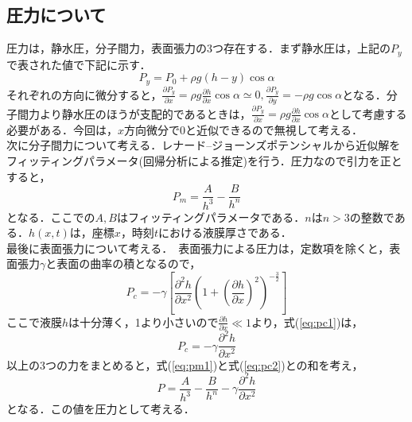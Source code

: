 \documentclass[autodetect-engine,dvipdfmx-if-dvi,ja=standard,a4paper,11pt]{bxjsarticle} %
\begin{document}
\subsection{圧力について}
圧力は，静水圧，分子間力，表面張力の3つ存在する．まず静水圧は，上記の$P_y$で表された値で下記に示す．　
\begin{equation}
P_y=P_0+\rho g(h-y)\cos\alpha
\end{equation}
それぞれの方向に微分すると，$\frac{\partial P_y}{\partial x}=\rho g\frac{\partial h}{\partial x}\cos\alpha\simeq0,\frac{\partial P_y}{\partial y}=-\rho g\cos\alpha$となる．分子間力より静水圧のほうが支配的であるときは，$\frac{\partial P_y}{\partial x}=\rho g\frac{\partial h}{\partial x}\cos\alpha$として考慮する必要がある．今回は，$x$方向微分で0と近似できるので無視して考える．\\
\　次に分子間力について考える．レナード--ジョーンズポテンシャルから近似解をフィッティングパラメータ(回帰分析による推定)を行う．圧力なので引力を正とすると，
\begin{equation}
P_m=\frac{A}{h^3}-\frac{B}{h^n}
\label{eq:pm1}
\end{equation}
となる．ここでの$A,B$はフィッティングパラメータである．$n$は$n>3$の整数である．$h(x,t)$は，座標$x$，時刻$t$における液膜厚さである．\\
\　最後に表面張力について考える．　表面張力による圧力は，定数項を除くと，表面張力$\gamma$と表面の曲率の積となるので，
\begin{equation}
P_c=-\gamma \left[\frac{\partial^2 h}{\partial x^2}\left(1+\left(\frac{\partial h}{\partial x}\right)^2\right)^{-\frac{3}{2}}\right]
\label{eq:pc1}
\end{equation}
ここで液膜$h$は十分薄く，1より小さいので$\frac{\partial h}{\partial x}\ll 1$より，式(\ref{eq:pc1})は，
\begin{equation}
P_c=-\gamma\frac{\partial^2 h}{\partial x^2}
\label{eq:pc2}
\end{equation}
\　以上の3つの力をまとめると，式(\ref{eq:pm1})と式(\ref{eq:pc2})との和を考え，
\begin{equation}
P=\frac{A}{h^3}-\frac{B}{h^n}-\gamma\frac{\partial^2 h}{\partial x^2}
\label{eq:pall}
\end{equation}
となる．この値を圧力として考える．
\end{document}
